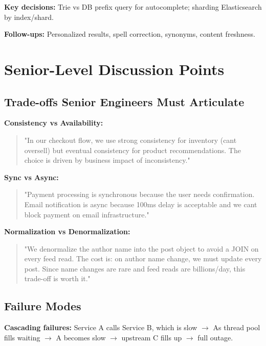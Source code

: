 \documentclass[11pt]{article}
\begin{document}
\textbf{Key decisions:} Trie vs DB prefix query for autocomplete; sharding Elasticsearch by index/shard.

\textbf{Follow-ups:} Personalized results, spell correction, synonyms, content freshness.

\section{Senior-Level Discussion Points}\label{senior-level-discussion-points}

\subsection{Trade-offs Senior Engineers Must Articulate}\label{trade-offs-senior-engineers-must-articulate}

\textbf{Consistency vs Availability:}

\begin{quote}
"In our checkout flow, we use strong consistency for inventory (can\textquotesingle t oversell) but eventual consistency for product recommendations. The choice is driven by business impact of inconsistency."
\end{quote}

\textbf{Sync vs Async:}

\begin{quote}
"Payment processing is synchronous because the user needs confirmation. Email notification is async because 100ms delay is acceptable and we can\textquotesingle t block payment on email infrastructure."
\end{quote}

\textbf{Normalization vs Denormalization:}

\begin{quote}
"We denormalize the author name into the post object to avoid a JOIN on every feed read. The cost is: on author name change, we must update every post. Since name changes are rare and feed reads are billions/day, this trade-off is worth it."
\end{quote}

\subsection{Failure Modes}\label{failure-modes}

\textbf{Cascading failures:} Service A calls Service B, which is slow \(\rightarrow\) A\textquotesingle s thread pool fills waiting \(\rightarrow\) A becomes slow \(\rightarrow\) upstream C fills up \(\rightarrow\) full outage.
\end{document}
